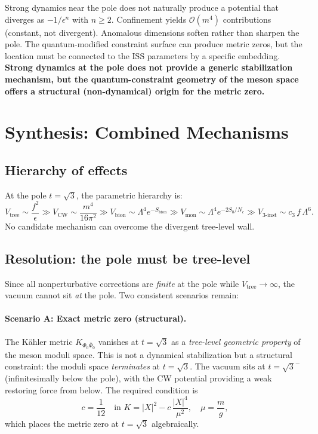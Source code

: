 Strong dynamics near the pole does not naturally produce a potential
that diverges as $-1/\epsilon^n$ with $n \geq 2$.
Confinement yields $\mathcal{O}(m^4)$ contributions (constant, not divergent).
Anomalous dimensions soften rather than sharpen the pole.
The quantum-modified constraint surface can produce metric zeros, but the
location must be connected to the ISS parameters by a specific embedding.
\textbf{Strong dynamics at the pole does not provide a generic stabilization
mechanism, but the quantum-constraint geometry of the meson space offers
a structural (non-dynamical) origin for the metric zero.}


\section{Synthesis: Combined Mechanisms}

\subsection{Hierarchy of effects}

At the pole $t = \sqrt{3}$, the parametric hierarchy is:
\begin{equation}
V_{\text{tree}} \sim \frac{f^2}{\epsilon} \gg V_{\text{CW}} \sim \frac{m^4}{16\pi^2}
\gg V_{\text{bion}} \sim \Lambda^4 e^{-S_{\text{bion}}}
\gg V_{\text{mon}} \sim \Lambda^4 e^{-2S_0/N_c}
\gg V_{3\text{-inst}} \sim c_3\,f\,\Lambda^6.
\end{equation}
No candidate mechanism can overcome the divergent tree-level wall.

\subsection{Resolution: the pole must be tree-level}

Since all nonperturbative corrections are \emph{finite} at the pole while $V_{\text{tree}} \to \infty$,
the vacuum cannot sit \emph{at} the pole. Two consistent scenarios remain:

\paragraph{Scenario A: Exact metric zero (structural).}
The K\"ahler metric $K_{\Phi_0\bar\Phi_0}$ vanishes at $t = \sqrt{3}$ as a
\emph{tree-level geometric property} of the meson moduli space.
This is not a dynamical stabilization but a structural constraint:
the moduli space \emph{terminates} at $t = \sqrt{3}$.
The vacuum sits at $t = \sqrt{3}^-$ (infinitesimally below the pole),
with the CW potential providing a weak restoring force from below.
The required condition is
\begin{equation}
c = \frac{1}{12} \quad \text{in } K = |X|^2 - c\,\frac{|X|^4}{\mu^2}, \quad \mu = \frac{m}{g},
\end{equation}
which places the metric zero at $t = \sqrt{3}$ algebraically.

